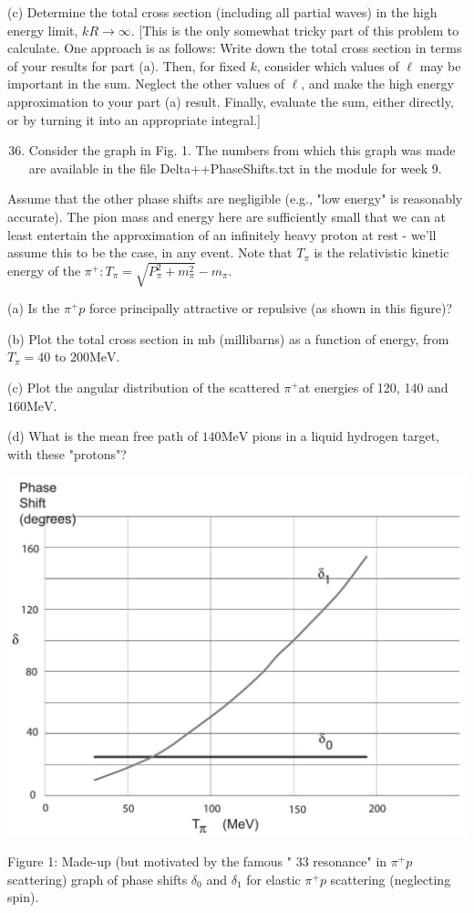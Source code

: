 \documentclass[10pt]{article}
\begin{document}
(c) Determine the total cross section (including all partial waves) in the high energy limit, $k R \rightarrow \infty$. [This is the only somewhat tricky part of this problem to calculate. One approach is as follows: Write down the total cross section in terms of your results for part (a). Then, for fixed $k$, consider which values of $\ell$ may be important in the sum. Neglect the other values of $\ell$, and make the high energy approximation to your part (a) result. Finally, evaluate the sum, either directly, or by turning it into an appropriate integral.]

\begin{enumerate}
  \setcounter{enumi}{35}
  \item Consider the graph in Fig. 1. The numbers from which this graph was made are available in the file Delta++PhaseShifts.txt in the module for week 9.
\end{enumerate}

Assume that the other phase shifts are negligible (e.g., "low energy" is reasonably accurate). The pion mass and energy here are sufficiently small that we can at least entertain the approximation of an infinitely heavy proton at rest - we'll assume this to be the case, in any event. Note that $T_{\pi}$ is the relativistic kinetic energy of the $\pi^{+}: T_{\pi}=\sqrt{P_{\pi}^{2}+m_{\pi}^{2}}-m_{\pi}$.

(a) Is the $\pi^{+} p$ force principally attractive or repulsive (as shown in this figure)?

(b) Plot the total cross section in mb (millibarns) as a function of energy, from $T_{\pi}=40$ to $200 \mathrm{MeV}$.

(c) Plot the angular distribution of the scattered $\pi^{+}$at energies of 120, 140 and $160 \mathrm{MeV}$.

(d) What is the mean free path of $140 \mathrm{MeV}$ pions in a liquid hydrogen target, with these "protons"?

\begin{center}
\includegraphics[max width=\textwidth]{2024_03_02_e4ccbaaa87e764c710bfg-3}
\end{center}

Figure 1: Made-up (but motivated by the famous " 33 resonance" in $\pi^{+} p$ scattering) graph of phase shifts $\delta_{0}$ and $\delta_{1}$ for elastic $\pi^{+} p$ scattering (neglecting spin).
\end{document}
